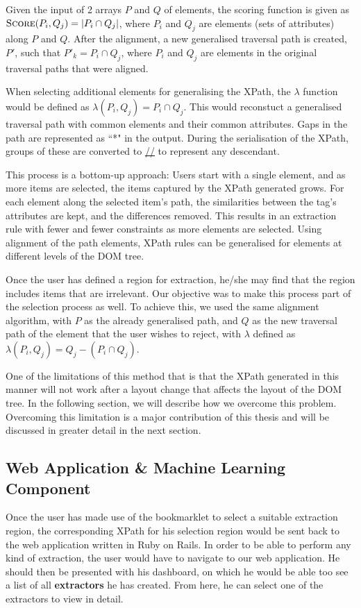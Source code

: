 \documentclass[a4paper,12pt]{nurop}
\begin{document}
Given the input of 2 arrays $P$ and $Q$ of elements, the scoring function is given as
$\textsc{Score}(P_i,Q_j) = |P_i \cap Q_j|$, where $P_i$ and $Q_j$ are elements (sets of
attributes) along $P$ and $Q$. After the alignment, a new generalised traversal path is
created, $P'$, such that $P'_k = P_i \cap Q_j$, where $P_i$ and $Q_j$ are elements in the
original traversal paths that were aligned.

When selecting additional elements for generalising the XPath, the $\lambda$ function would be
defined as $\lambda(P_i,Q_j) = P_i \cap Q_j$. This would reconstuct a generalised traversal
path with common elements and their common attributes. Gaps in the path are represented as ``*"
 in the output. During the serialisation of the XPath, groups of these are converted to
 \url{//} to represent any descendant.
 
 This process is a bottom-up approach: Users start with a single element, and as more items are
selected, the items captured by the XPath generated grows. For each element along the selected
item's path, the similarities between the tag's attributes are kept, and the differences
removed. This results in an extraction rule with fewer and fewer constraints as more elements
are selected. Using alignment of the path elements, XPath rules can be generalised for elements at different
levels of the DOM tree.

Once the user has defined a region for extraction, he/she may find that the region includes
items that are irrelevant. Our objective was to make this process part of the selection process as
well. To achieve this, we used the same alignment algorithm, with $P$ as the already
generalised path, and $Q$ as the new traversal path of the element that the user wishes to
reject, with $\lambda$ defined as $\lambda(P_i,Q_j) = Q_j - (P_i \cap Q_j)$.

One of the limitations of this method that is that the XPath generated
in this manner will not work after a layout change that affects the layout of the DOM
tree. In the following section, we will describe how we overcome this problem. Overcoming
this limitation is a major contribution of this thesis and will be discussed in greater
detail in the next section.

\subsection{Web Application \& Machine Learning Component}

Once the user has made use of the bookmarklet to select a suitable extraction region,
the corresponding XPath for his selection region would be sent back to the web application
written in Ruby on Rails. In order to be able to perform any kind of extraction, the user
would have to navigate to our web application. He should then be presented with his dashboard,
on which he would be able too see a list of all \textbf{extractors} he has created. From here,
he can select one of the extractors to view in detail.
\end{document}
